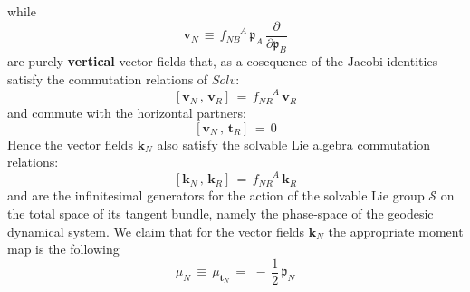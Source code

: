 \documentclass[10pt,a4paper]{article}
\newcommand{\ft}[2]{{\textstyle\frac{#1}{#2}}}
\begin{document}
while
\begin{equation}\label{cremacatalana}
  \mathbf{v}_N \, \equiv \, f^{\phantom{NB}A}_{NB}\,\mathfrak{p}_A \, \frac{\partial}{\partial \mathfrak{p}_B}
\end{equation}
are  purely \textbf{vertical} vector fields that, as a cosequence of the Jacobi identities satisfy the commutation relations of $Solv$:
\begin{equation}\label{vicommi}
  \left[\mathbf{v}_N\, , \,\mathbf{v}_R  \right] \, = \,
  f^{\phantom{NR}A}_{NR} \, \mathbf{v}_R
\end{equation}
and commute with the horizontal partners:
\begin{equation}\label{zerocommi}
  \left[\mathbf{v}_N\, , \,\mathbf{t}_R  \right]\, = \, 0
\end{equation}
Hence the vector fields $\mathbf{k}_N$ also satisfy the solvable Lie algebra commutation relations:
\begin{equation}\label{vicommi}
  \left[\mathbf{k}_N\, , \,\mathbf{k}_R  \right] \, = \,
  f^{\phantom{NR}A}_{NR} \, \mathbf{k}_R
\end{equation}
and are the infinitesimal generators for the action of the solvable Lie group $\mathcal{S}$ on the total space of its tangent bundle, namely the phase-space of the geodesic dynamical system.
 We claim that for the vector fields $\mathbf{k}_N$ the appropriate moment map is the following
\begin{equation}\label{aspettamo}
  \mu_N \, \equiv \, \mu_{\mathbf{t}_N} \, = \, \, - \, \ft 12 \, \mathfrak{p}_N
\end{equation}
\end{document}
